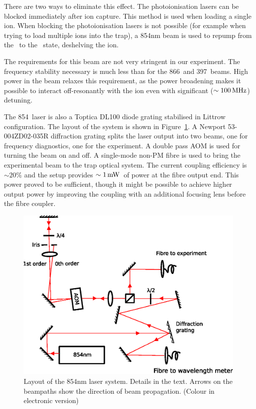There are two ways to eliminate this effect. The photoionisation lasers can be blocked immediately after ion capture. This method is used when loading a single ion. When blocking the photoionisation lasers is not possible (for example when trying to load multiple ions into the trap), a 854nm beam is used to repump from the \dfh\, to the \pth\, state, deshelving the ion.

The requirements for this beam are not very stringent in our experiment. The frequency stability necessary is much less than for the 866\nm\, and 397\nm\, beams. High power in the beam relaxes this requirement, as the power broadening makes it possible to interact off-resonantly with the ion even with significant ($\sim 100\,\mbox{MHz}$) detuning. 

The 854\nm\, laser is also a Toptica DL100 diode grating stabilised in Littrow configuration. The layout of the system is shown in Figure~\ref{fig:854layout}. A Newport 53-004ZD02-035R diffraction grating splits the laser output into two beams, one for frequency diagnostics, one for the experiment. A double pass AOM is used for turning the beam on and off. A single-mode non-PM fibre is used to bring the experimental beam to the trap optical system.  The current coupling efficiency is $\sim20\%$ and the setup provides  $\sim 1\,\mbox{mW}\,$ of power at the fibre output end. This power proved to be sufficient, though it might be possible to achieve higher output power by improving the coupling with an additional focusing lens before the fibre coupler.

\begin{figure}[h!t]
\centering
\includegraphics[width=13cm]{chapter4/854layout/854layout_v3}
\caption[854nm laser layout]{Layout of the 854nm laser system. Details in the text. Arrows on the beampaths show the direction of beam propagation. (Colour in electronic version)}
\label{fig:854layout}
\end{figure} 


